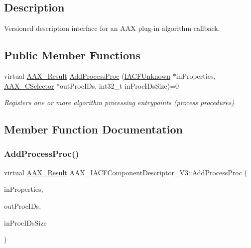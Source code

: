 \subsection{Description}
Versioned description interface for an A\+AX plug-\/in algorithm callback. \subsection*{Public Member Functions}
\begin{DoxyCompactItemize}
\item 
virtual \mbox{\hyperlink{a00392_a4d8f69a697df7f70c3a8e9b8ee130d2f}{A\+A\+X\+\_\+\+Result}} \mbox{\hyperlink{a01633_aa42746bcccc0e91186464f86b39b8cff}{Add\+Process\+Proc}} (\mbox{\hyperlink{a01409}{I\+A\+C\+F\+Unknown}} $\ast$in\+Properties, \mbox{\hyperlink{a00392_aeaf9b387f902c50a8360ff423f4a1f23}{A\+A\+X\+\_\+\+C\+Selector}} $\ast$out\+Proc\+I\+Ds, int32\+\_\+t in\+Proc\+I\+Ds\+Size)=0
\begin{DoxyCompactList}\small\item\em Registers one or more algorithm processing entrypoints (process procedures) \end{DoxyCompactList}\end{DoxyCompactItemize}


\subsection{Member Function Documentation}
\mbox{\label{a01633_aa42746bcccc0e91186464f86b39b8cff}} 
\subsubsection{\texorpdfstring{AddProcessProc()}{AddProcessProc()}}
{\footnotesize\ttfamily virtual \mbox{\hyperlink{a00392_a4d8f69a697df7f70c3a8e9b8ee130d2f}{A\+A\+X\+\_\+\+Result}} A\+A\+X\+\_\+\+I\+A\+C\+F\+Component\+Descriptor\+\_\+\+V3\+::\+Add\+Process\+Proc (\begin{DoxyParamCaption}\item[{\mbox{\hyperlink{a01409}{I\+A\+C\+F\+Unknown}} $\ast$}]{in\+Properties,  }\item[{\mbox{\hyperlink{a00392_aeaf9b387f902c50a8360ff423f4a1f23}{A\+A\+X\+\_\+\+C\+Selector}} $\ast$}]{out\+Proc\+I\+Ds,  }\item[{int32\+\_\+t}]{in\+Proc\+I\+Ds\+Size }\end{DoxyParamCaption})\hspace{0.3cm}{\ttfamily [pure virtual]}}



